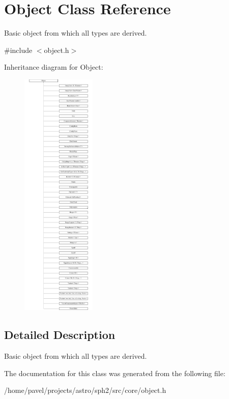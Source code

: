 \hypertarget{classObject}{}\section{Object Class Reference}
\label{classObject}


Basic object from which all types are derived.  




{\ttfamily \#include $<$object.\+h$>$}

Inheritance diagram for Object\+:\begin{figure}[H]
\begin{center}
\leavevmode
\includegraphics[height=12.000000cm]{classObject}
\end{center}
\end{figure}


\subsection{Detailed Description}
Basic object from which all types are derived. 

The documentation for this class was generated from the following file\+:\begin{DoxyCompactItemize}
\item 
/home/pavel/projects/astro/sph2/src/core/object.\+h\end{DoxyCompactItemize}
